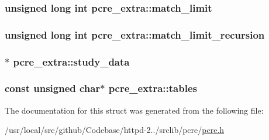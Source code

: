 \subsubsection[{\texorpdfstring{match\+\_\+limit}{match_limit}}]{\setlength{\rightskip}{0pt plus 5cm}unsigned long {\bf int} pcre\+\_\+extra\+::match\+\_\+limit}\hypertarget{structpcre__extra_aa1a16c13f086255baba34f5e8a180186}{}\label{structpcre__extra_aa1a16c13f086255baba34f5e8a180186}
\subsubsection[{\texorpdfstring{match\+\_\+limit\+\_\+recursion}{match_limit_recursion}}]{\setlength{\rightskip}{0pt plus 5cm}unsigned long {\bf int} pcre\+\_\+extra\+::match\+\_\+limit\+\_\+recursion}\hypertarget{structpcre__extra_ac62a2bd02946b6b1e59615f15c903b37}{}\label{structpcre__extra_ac62a2bd02946b6b1e59615f15c903b37}
\subsubsection[{\texorpdfstring{study\+\_\+data}{study_data}}]{$\ast$ pcre\+\_\+extra\+::study\+\_\+data}\hypertarget{structpcre__extra_a27f29bdf9c4526d5bb3fb8ee514ee8e8}{}\label{structpcre__extra_a27f29bdf9c4526d5bb3fb8ee514ee8e8}
\subsubsection[{\texorpdfstring{tables}{tables}}]{\setlength{\rightskip}{0pt plus 5cm}const unsigned char$\ast$ pcre\+\_\+extra\+::tables}\hypertarget{structpcre__extra_ae79d65e283cef92ecb9afe6961c46a4e}{}\label{structpcre__extra_ae79d65e283cef92ecb9afe6961c46a4e}


The documentation for this struct was generated from the following file\+:\begin{DoxyCompactItemize}
\item 
/usr/local/src/github/\+Codebase/httpd-\/2../srclib/pcre/\hyperlink{pcre_8h}{pcre.\+h}\end{DoxyCompactItemize}
